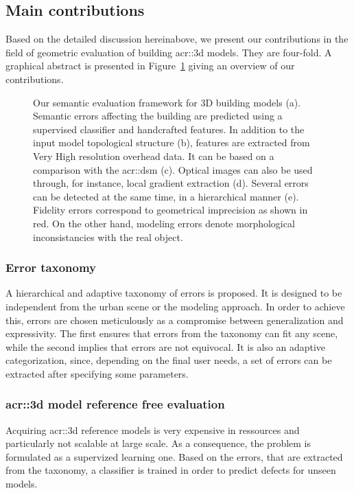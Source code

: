     \subsection{Main contributions}
        \label{sec::introduction::contributions::contributions}
        Based on the detailed discussion hereinabove, we present our contributions in the field of geometric evaluation of building \gls{acr::3d} models.
        They are four-fold.
        A graphical abstract is presented in Figure~\ref{fig::graphical_abstract} giving an overview of our contributions.
        \begin{figure}[htpb]
            \centering
                        
            \caption{
                \label{fig::graphical_abstract} Our semantic evaluation framework for 3D building models (a).
                Semantic errors affecting the building are predicted using a supervised classifier and handcrafted features.
                In addition to the input model topological structure (b), features are extracted from Very High resolution overhead data.
                It can be based on a comparison with the \gls*{acr::dsm} (c).
                Optical images can also be used through, for instance, local gradient extraction (d).
                Several errors can be detected at the same time, in a hierarchical manner (e).
                Fidelity errors correspond to geometrical imprecision as shown in red.
                On the other hand, modeling errors denote morphological inconsistancies with the real object.
            }
        \end{figure}
        \subsubsection{Error taxonomy}
            A hierarchical and adaptive taxonomy of errors is proposed.
            It is designed to be independent from the urban scene or the modeling approach.
            In order to achieve this, errors are chosen meticulously as a compromise between generalization and expressivity.
            The first ensures that errors from the taxonomy can fit any scene, while the second implies that errors are not equivocal.
            It is also an adaptive categorization, since, depending on the final user needs, a set of errors can be extracted after specifying some parameters.
            
        \subsubsection{\gls*{acr::3d} model reference free evaluation}
            Acquiring \gls{acr::3d} reference models is very expensive in ressources and particularly not scalable at large scale.
            As a consequence, the problem is formulated as a supervized learning one.
            Based on the errors, that are extracted from the taxonomy, a classifier is trained in order to predict defects for unseen models.

